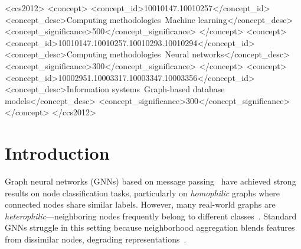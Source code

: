 \documentclass[sigconf]{acmart}
\begin{document}
\begin{CCSXML}
<ccs2012>
   <concept>
       <concept_id>10010147.10010257</concept_id>
       <concept_desc>Computing methodologies~Machine learning</concept_desc>
       <concept_significance>500</concept_significance>
   </concept>
   <concept>
       <concept_id>10010147.10010257.10010293.10010294</concept_id>
       <concept_desc>Computing methodologies~Neural networks</concept_desc>
       <concept_significance>300</concept_significance>
   </concept>
   <concept>
       <concept_id>10002951.10003317.10003347.10003356</concept_id>
       <concept_desc>Information systems~Graph-based database models</concept_desc>
       <concept_significance>300</concept_significance>
   </concept>
 </ccs2012>
\end{CCSXML}


\maketitle

\section{Introduction}

Graph neural networks (GNNs) based on message passing~\citep{gilmer2017mpnn, kipf2017semi, scarselli2009gnn} have achieved strong results on node classification tasks, particularly on \emph{homophilic} graphs where connected nodes share similar labels. However, many real-world graphs are \emph{heterophilic}---neighboring nodes frequently belong to different classes~\citep{zhu2020h2gcn, pei2020geomgcn}. Standard GNNs struggle in this setting because neighborhood aggregation blends features from dissimilar nodes, degrading representations~\citep{li2018oversmoothing}.
\end{document}
